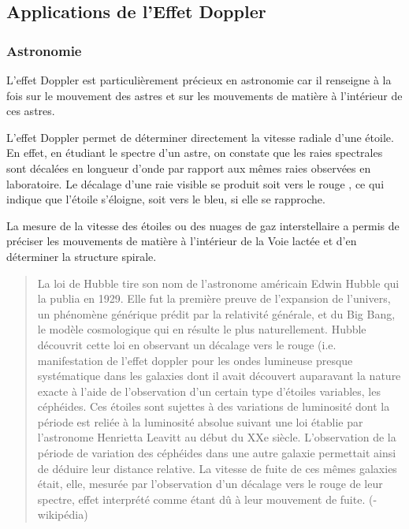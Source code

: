 \documentclass[11pt,a4paper]{article}
\begin{document}
\subsection{Applications de l'Effet Doppler}

\subsubsection{Astronomie}
L’effet Doppler est particulièrement précieux en astronomie car il renseigne à la fois sur le mouvement des astres et sur les mouvements de matière à l’intérieur de ces astres.

L’effet Doppler permet de déterminer directement la vitesse radiale d’une étoile. En effet, en étudiant le spectre d’un astre, on constate que les raies spectrales sont décalées en longueur d’onde par rapport aux mêmes raies observées en laboratoire. Le décalage d’une raie visible se produit soit vers le rouge , ce qui indique que l’étoile s’éloigne, soit vers le bleu, si elle se rapproche.

La mesure de la vitesse des étoiles ou des nuages de gaz interstellaire a permis de préciser les mouvements de matière à l’intérieur de la Voie lactée et d’en déterminer la structure spirale.
\begin{quote}
  La loi de Hubble tire son nom de l'astronome américain Edwin Hubble qui la publia en 1929. Elle fut la première preuve de l'expansion de l'univers, un phénomène générique prédit par la relativité générale, et du Big Bang, le modèle cosmologique qui en résulte le plus naturellement. Hubble découvrit cette loi en observant un décalage vers le rouge  (i.e. manifestation de l’effet doppler pour les ondes lumineuse presque systématique dans les galaxies dont il avait découvert auparavant la nature exacte à l'aide de l'observation d'un certain type d'étoiles variables, les céphéides. Ces étoiles sont sujettes à des variations de luminosité dont la période est reliée à la luminosité absolue suivant une loi établie par l'astronome Henrietta Leavitt au début du XXe siècle. L'observation de la période de variation des céphéides dans une autre galaxie permettait ainsi de déduire leur distance relative. La vitesse de fuite de ces mêmes galaxies était, elle, mesurée par l'observation d'un décalage vers le rouge de leur spectre, effet interprété comme étant dû à leur mouvement de fuite.   (-wikipédia)  
\end{quote}
\end{document}
